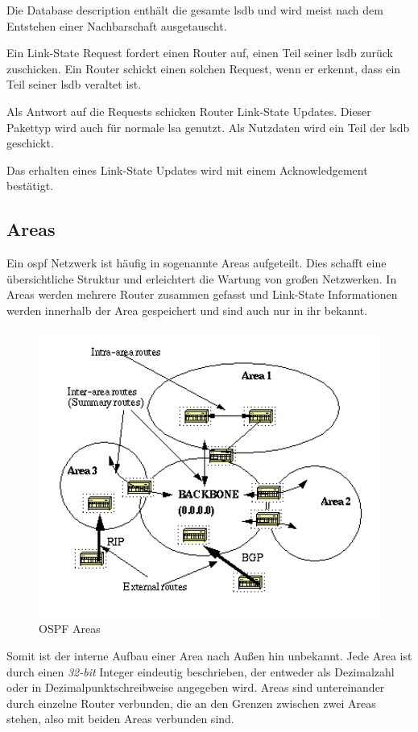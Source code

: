 \documentclass[11pt,a4paper,final]{article}
\begin{document}
Die Database description enthält die gesamte \ac{lsdb} und wird meist nach dem Entstehen einer Nachbarschaft ausgetauscht.

Ein Link-State Request fordert einen Router auf, einen Teil seiner \ac{lsdb} zurück zuschicken. Ein Router schickt einen solchen Request, wenn er erkennt, dass ein Teil seiner \ac{lsdb} veraltet ist.

Als Antwort auf die Requests schicken Router Link-State Updates. Dieser Pakettyp wird auch für normale \ac{lsa} genutzt. Als Nutzdaten wird ein Teil der \ac{lsdb} geschickt.

Das erhalten eines Link-State Updates wird mit einem Acknowledgement bestätigt.
\citep{ciscoDocWikiOSPF}
\subsection{Areas}
Ein \ac{ospf} Netzwerk ist häufig in sogenannte Areas aufgeteilt.
Dies schafft eine übersichtliche Struktur und erleichtert die Wartung von großen Netzwerken. In Areas werden mehrere Router zusammen gefasst und Link-State Informationen werden innerhalb der Area gespeichert und sind auch nur in ihr bekannt.
\begin{figure}[H]
\includegraphics[width=1.0\textwidth]{images/ospfarea.png}
\caption[OSPF Areas]{OSPF Areas\footnotemark}
\label{fig:ospf-area}
\end{figure}
Somit ist der interne Aufbau einer Area nach Außen hin unbekannt.
Jede Area ist durch einen \textit{32-bit} Integer eindeutig beschrieben, der entweder als Dezimalzahl oder in Dezimalpunktschreibweise angegeben wird.
Areas sind untereinander durch einzelne Router verbunden, die an den Grenzen zwischen zwei Areas stehen, also mit beiden Areas verbunden sind.
\end{document}
